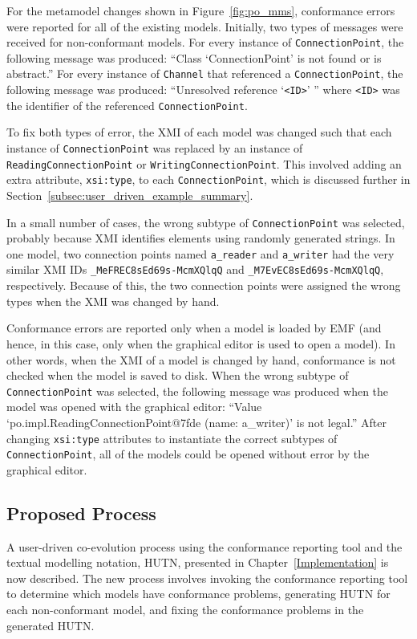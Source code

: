 For the metamodel changes shown in Figure~\ref{fig:po_mms}, conformance errors were reported for all of the existing models. Initially, two types of messages were received for non-conformant models. For every instance of \texttt{Co\-nn\-ec\-ti\-o\-nPo\-i\-nt}, the following message was produced: ``Class `ConnectionPoint' is not found or is abstract.'' For every instance of \texttt{Ch\-an\-n\-el} that referenced a \texttt{Co\-nn\-ec\-ti\-o\-nPo\-i\-nt}, the following message was produced: ``Unresolved reference `\texttt{<ID>}' '' where \texttt{<ID>} was the identifier of the referenced \texttt{Co\-nn\-ec\-ti\-o\-nPo\-i\-nt}.

To fix both types of error, the XMI of each model was changed such that each instance of \texttt{Co\-nn\-ec\-ti\-onPo\-in\-t} was replaced by an instance of \texttt{Re\-ad\-i\-ngCo\-nn\-ec\-ti\-o\-nPo\-i\-nt} or \texttt{Wr\-i\-ti\-ngCo\-nn\-ec\-ti\-o\-nPo\-i\-nt}. This involved adding an extra attribute, \texttt{xsi:type}, to each \texttt{Co\-nn\-ec\-ti\-onPo\-in\-t}, which is discussed further in Section~\ref{subsec:user_driven_example_summary}.

In a small number of cases, the wrong subtype of \texttt{Co\-nn\-ec\-ti\-onPo\-in\-t} was selected, probably because XMI identifies elements using randomly generated strings. In one model, two connection points named \texttt{a\_reader} and \texttt{a\_writer} had the very similar XMI IDs \texttt{\_MeFREC8sEd69s-McmXQlqQ} and \texttt{\_M7EvEC8sEd69s-McmXQlqQ}, respectively. Because of this, the two connection points were assigned the wrong types when the XMI was changed by hand.

Conformance errors are reported only when a model is loaded by EMF (and hence, in this case, only when the graphical editor is used to open a model). In other words, when the XMI of a model is changed by hand, conformance is not checked when the model is saved to disk. When the wrong subtype of  \texttt{Co\-nn\-ec\-ti\-onPo\-in\-t} was selected, the following message was produced when the model was opened with the graphical editor: ``Value `po.im\-pl.Re\-ad\-i\-ngCo\-nn\-ec\-ti\-onPo\-i\-nt@7f\-de (name: a\_writer)' is not legal.'' After changing \texttt{xsi:type} attributes to instantiate the correct subtypes of \texttt{Co\-nn\-ec\-ti\-onPo\-in\-t}, all of the models could be opened without error by the graphical editor.


\subsection{Proposed Process}
A user-driven co-evolution process using the conformance reporting tool and the textual modelling notation, HUTN, presented in Chapter~\ref{Implementation} is now described. The new process involves invoking the conformance reporting tool to determine which models have conformance problems, generating HUTN for each non-conformant model, and fixing the conformance problems in the generated HUTN.

